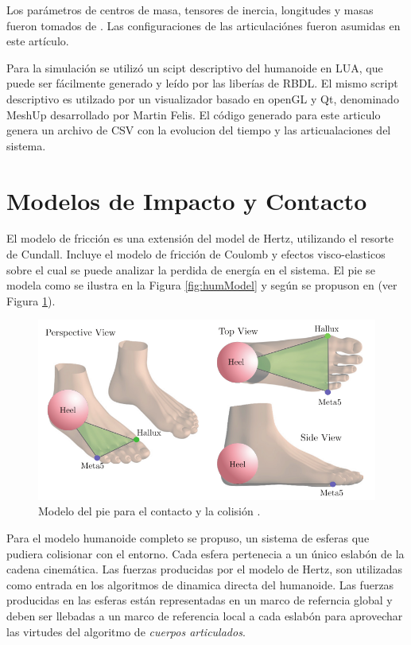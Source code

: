 \documentclass[journal,letterpaper,twoside,twocolumn]{IEEEtran}
\begin{document}
Los parámetros de centros de masa, tensores de inercia, longitudes y masas fueron tomados de \cite{Leva1996}. Las configuraciones de las articulaciónes fueron asumidas en este artículo.  

Para la simulación se utilizó un scipt descriptivo del humanoide en LUA, que puede ser fácilmente generado y leído por las liberías de RBDL. El mismo script descriptivo es utilzado por un visualizador basado en openGL y Qt, denominado MeshUp desarrollado por Martin Felis. El código generado para este articulo genera un archivo de CSV con la evolucion del tiempo y las articualaciones del sistema. 

\section{Modelos de Impacto y Contacto}
\label{sec:impYcon}
El modelo de fricción es una extensión del model de Hertz, utilizando el resorte de Cundall. Incluye el modelo de fricción de Coulomb y efectos visco-elasticos sobre el cual se puede analizar la perdida de energía en el sistema. El pie se modela como se ilustra en la Figura \ref{fig:humModel} y según se propuson en \cite{Felis2016a} (ver Figura \ref{fig:footModel}). 
\begin{figure}[!h]
  \centering
  \includegraphics[scale=0.3]{Felis2016aFeetModel.png}
  \caption{Modelo del pie para el contacto y la colisión \protect\cite{Felis2016a}.}
  \label{fig:footModel}
\end{figure}

Para el modelo humanoide completo se propuso, un sistema de esferas que pudiera colisionar con el entorno. Cada esfera pertenecia a un único eslabón de la cadena cinemática. Las fuerzas producidas por el modelo de Hertz, son utilizadas como entrada en los algoritmos de dinamica directa del humanoide. Las fuerzas producidas en las esferas están representadas en un marco de referncia global y deben ser llebadas a un marco de referencia local a cada eslabón para aprovechar las virtudes del algoritmo de \emph{cuerpos articulados}.
\end{document}
